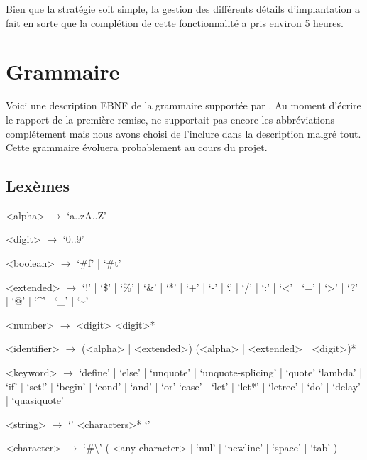 \documentclass[11pt]{report}
\begin{document}
Bien que la stratégie soit simple, la gestion des différents détails
d'implantation a fait en sorte que la complétion de cette
fonctionnalité a pris environ 5 heures.




\appendix
\chapter{Grammaire}
\label{grammaire}
Voici une description EBNF de la grammaire supportée par \sins{}. Au
moment d'écrire le rapport de la première remise, \sins{} ne
supportait pas encore les abbréviations complétement mais nous avons
choisi de l'inclure dans la description malgré tout. Cette grammaire
évoluera probablement au cours du projet.

\setlength{\grammarindent}{3em}


\section{Lexèmes}
\label{grammar-tokens}
\begin{grammar}
  <alpha> $\longrightarrow$ `a..zA..Z'

  <digit> $\longrightarrow$ `0..9'

  <boolean> $\longrightarrow$ `\#f' | `\#t'

  <extended> $\longrightarrow$ `!' | `\$' | `\%' | `\&' | `*' | `+' | `-' | `.' | `/' | `:'
  | `<' | `=' | `>' | `?' | `@' | `\textasciicircum' | `\_' | `\textasciitilde'

  <number> $\longrightarrow$ <digit> <digit>*

  <identifier> $\longrightarrow$ (<alpha> | <extended>) (<alpha> | <extended> |
  <digit>)*

  <keyword> $\longrightarrow$ `define' | `else' | `unquote' | `unquote-splicing' | `quote'
  \alt `lambda' | `if' | `set!' | `begin' | `cond' | `and' | `or'
  \alt `case' | `let' | `let*' | `letrec' | `do' | `delay' |
  `quasiquote'

  <string> $\longrightarrow$ `\textquotedbl' <characters>* `\textquotedbl'

  <character> $\longrightarrow$ `#\textbackslash' ( <any character> | `nul' |
  `newline' | `space' | `tab' )

\end{grammar}
\end{document}
